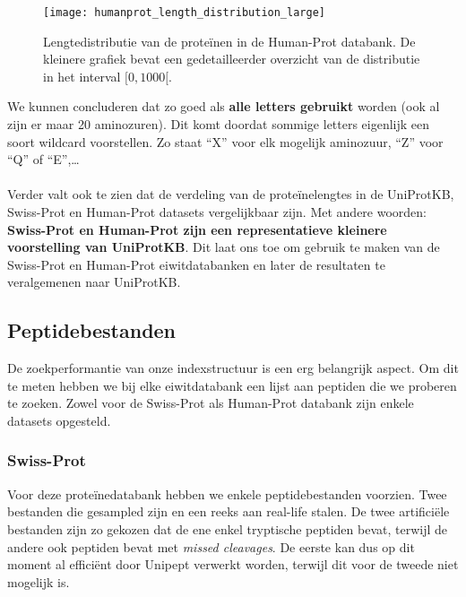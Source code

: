 \begin{figure}[h]
    \centering
    \texttt{[image: humanprot\_length\_distribution\_large]}
    \caption{Lengtedistributie van de proteïnen in de Human-Prot databank. De kleinere grafiek bevat een gedetailleerder overzicht van de distributie in het interval $[0, 1000[$.}\label{fig:humanprot_length}
\end{figure}

We kunnen concluderen dat zo goed als \textbf{alle letters gebruikt} worden (ook al zijn er maar 20 aminozuren).
Dit komt doordat sommige letters eigenlijk een soort wildcard voorstellen.
Zo staat ``X'' voor elk mogelijk aminozuur, ``Z'' voor ``Q'' of ``E'',\ldots
\\ \\
Verder valt ook te zien dat de verdeling van de proteïnelengtes in de UniProtKB, Swiss-Prot en Human-Prot datasets vergelijkbaar zijn.
Met andere woorden: \textbf{Swiss-Prot en Human-Prot zijn een representatieve kleinere voorstelling van UniProtKB\@}.
Dit laat ons toe om gebruik te maken van de Swiss-Prot en Human-Prot eiwitdatabanken en later de resultaten te veralgemenen naar UniProtKB\@.

\subsection{Peptidebestanden}\label{subsec:peptide-zoek-bestanden}
De zoekperformantie van onze indexstructuur is een erg belangrijk aspect.
Om dit te meten hebben we bij elke eiwitdatabank een lijst aan peptiden die we proberen te zoeken.
Zowel voor de Swiss-Prot als Human-Prot databank zijn enkele datasets opgesteld.

\subsubsection{Swiss-Prot}
Voor deze proteïnedatabank hebben we enkele peptidebestanden voorzien.
Twee bestanden die gesampled zijn en een reeks aan real-life stalen.
De twee artificiële bestanden zijn zo gekozen dat de ene enkel tryptische peptiden bevat, terwijl de andere ook peptiden bevat met \textit{missed cleavages}.
De eerste kan dus op dit moment al efficiënt door Unipept verwerkt worden, terwijl dit voor de tweede niet mogelijk is.

